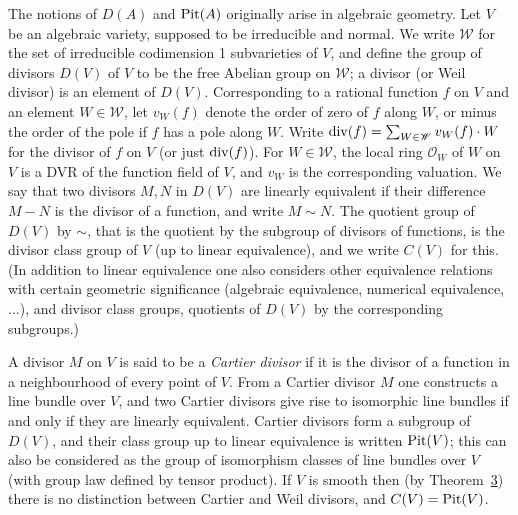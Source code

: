 The notions of $D(A)$ and $\operatorname{Pit}(A)$ originally arise in algebraic geometry.
Let $V$ be an algebraic variety, supposed to be irreducible and normal. We
write $\mathscr{W}$ for the set of irreducible codimension 1 subvarieties of $V$, and
define the group of divisors $D(V)$ of $V$ to be the free Abelian group on $\mathscr{W}$;
a divisor (or Weil divisor) is an element of $D(V)$. Corresponding to a
rational function $f$ on $V$ and an element $W \in \mathscr{W}$, let $v_W(f)$ denote the
order of zero of $f$ along $W$, or minus the order of the pole if $f$ has a pole
along $W$. Write $\operatorname{div}(f) = \sum_{W \in \mathscr{W}} v_W(f) \cdot W$ for the divisor of $f$ on $V$ (or just
$\operatorname{div}(f)$). For $W \in \mathscr{W}$, the local ring $\mathcal{O}_W$ of $W$ on $V$ is a DVR of the function
field of $V$, and $v_W$ is the corresponding valuation. We say that two divisors
$M, N$ in $D(V)$ are linearly equivalent if their difference $M - N$ is the divisor of a
function, and write $M \sim N$. The quotient group of $D(V)$ by $\sim$, that is the
quotient by the subgroup of divisors of functions, is the divisor class group
of $V$ (up to linear equivalence), and we write $C(V)$ for this. (In addition
to linear equivalence one also considers other equivalence relations with
certain geometric significance (algebraic equivalence, numerical equivalence,
$\ldots$), and divisor class groups, quotients of $D(V)$ by the corresponding subgroups.)

A divisor $M$ on $V$ is said to be a \emph{Cartier divisor} if it is the divisor of a
function in a neighbourhood of every point of $V$. From a Cartier divisor $M$
one constructs a line bundle over $V$, and two Cartier divisors give rise to
isomorphic line bundles if and only if they are linearly equivalent. Cartier
divisors form a subgroup of $D(V)$, and their class group up to linear
equivalence is written $\operatorname{Pit}(V)$; this can also be considered as the group of
isomorphism classes of line bundles over $V$ (with group law defined by
tensor product). If $V$ is smooth then (by Theorem~\hyperref[thm:20.3]{3}) there is no distinction
between Cartier and Weil divisors, and $C(V) = \operatorname{Pit}(V)$.

